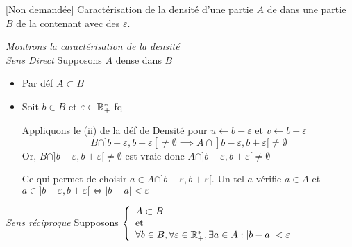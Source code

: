 \documentclass{article}
\begin{document}
\pagebreak
{}
	{[Non demandée] Caractérisation de la densité d’une partie $A$ de \R dans une partie $B$ de \R la contenant avec des $\varepsilon$.}

	\textit{Montrons la caractérisation de la densité}\\
	\emph{Sens Direct} Supposons $A$ dense dans $B$
	\begin{itemize}[label=\textemdash]
		\item Par déf $A \subset B$
		\item Soit $b \in B$ et $\varepsilon \in \mathbb R_+^*$ fq

		      Appliquons le (ii) de la déf de Densité pour $u \leftarrow b - \varepsilon$ et $v \leftarrow b + \varepsilon$
		      $$B \cap ]b - \varepsilon, b + \varepsilon[ \neq \emptyset \implies A \cap ]b - \varepsilon,  b + \varepsilon[ \neq \emptyset$$
			      Or, $B \cap ]b - \varepsilon, b + \varepsilon[ \neq \emptyset$ est vraie
				      donc $A \cap ]b - \varepsilon,  b + \varepsilon[ \neq \emptyset$

				      Ce qui permet de choisir $a \in A \cap ]b - \varepsilon,  b + \varepsilon[$.
				      Un tel $a$ vérifie $a \in A$ et $a \in ]b - \varepsilon,  b + \varepsilon[ \iff |b-a| < \varepsilon$
	\end{itemize}
	\bigbreak
	\noindent \emph{Sens réciproque} Supposons $\left\{\begin{array}{ll} A \subset B \\\mathrm{et}\\ \forall b \in B, \forall \varepsilon \in \mathbb R_+^*, \exists a \in A: |b-a|< \varepsilon \end{array}\right.$


\end{question_kholle}
\end{document}
